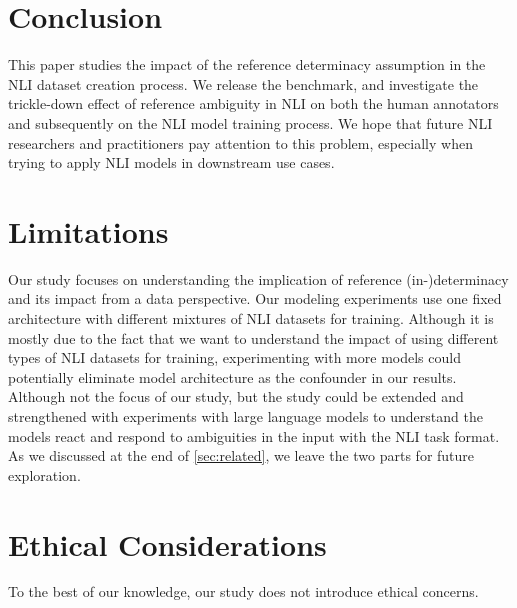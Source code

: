 \section{Conclusion}
\label{sec:conclusion}

This paper studies the impact of the reference determinacy assumption in the NLI dataset creation process. We release the \datasetname benchmark, and investigate the trickle-down effect of reference ambiguity in NLI on both the human annotators and subsequently on the NLI model training process. We hope that future NLI researchers and practitioners pay attention to this problem, especially when trying to apply NLI models in downstream use cases.

\section*{Limitations}
Our study focuses on understanding the implication of reference (in-)determinacy and its impact from a data perspective. Our modeling experiments use one fixed architecture with different mixtures of NLI datasets for training. Although it is mostly due to the fact that we want to understand the impact of using different types of NLI datasets for training, experimenting with more models could potentially eliminate model architecture as the confounder in our results. 
Although not the focus of our study, but the study could be extended and strengthened with experiments with large language models to understand the models react and respond to ambiguities in the input with the NLI task format. As we discussed at the end of \cref{sec:related}, we leave the two parts for future exploration.

\section*{Ethical Considerations}
To the best of our knowledge, our study does not introduce ethical concerns.